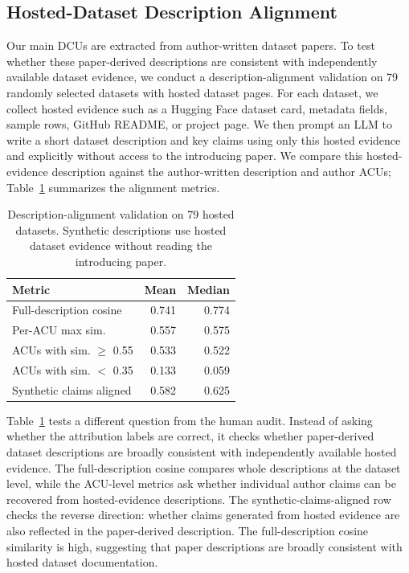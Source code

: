 \documentclass[11pt]{article}
\begin{document}
\subsection{Hosted-Dataset Description Alignment}
Our main DCUs are extracted from author-written dataset papers.
To test whether these paper-derived descriptions are consistent with independently available dataset evidence, we conduct a description-alignment validation on 79 randomly selected datasets with hosted dataset pages.
For each dataset, we collect hosted evidence such as a Hugging Face dataset card, metadata fields, sample rows, GitHub README, or project page.
We then prompt an LLM to write a short dataset description and key claims using only this hosted evidence and explicitly without access to the introducing paper.
We compare this hosted-evidence description against the author-written description and author ACUs; Table~\ref{tab:description_alignment} summarizes the alignment metrics.
\begin{table}[h]
\centering
\small
\begin{tabular}{lrr}
\toprule
Metric & Mean & Median \\
\midrule
Full-description cosine & 0.741 & 0.774 \\
Per-ACU max sim. & 0.557 & 0.575 \\
ACUs with sim. $\geq$ 0.55 & 0.533 & 0.522 \\
ACUs with sim. $<$ 0.35 & 0.133 & 0.059 \\
Synthetic claims aligned & 0.582 & 0.625 \\
\bottomrule
\end{tabular}
\caption{Description-alignment validation on 79 hosted datasets. Synthetic descriptions use hosted dataset evidence without reading the introducing paper.}
\label{tab:description_alignment}
\end{table}
Table~\ref{tab:description_alignment} tests a different question from the human audit.
Instead of asking whether the attribution labels are correct, it checks whether paper-derived dataset descriptions are broadly consistent with independently available hosted evidence.
The full-description cosine compares whole descriptions at the dataset level, while the ACU-level metrics ask whether individual author claims can be recovered from hosted-evidence descriptions.
The synthetic-claims-aligned row checks the reverse direction: whether claims generated from hosted evidence are also reflected in the paper-derived description.
The full-description cosine similarity is high, suggesting that paper descriptions are broadly consistent with hosted dataset documentation.
\end{document}
